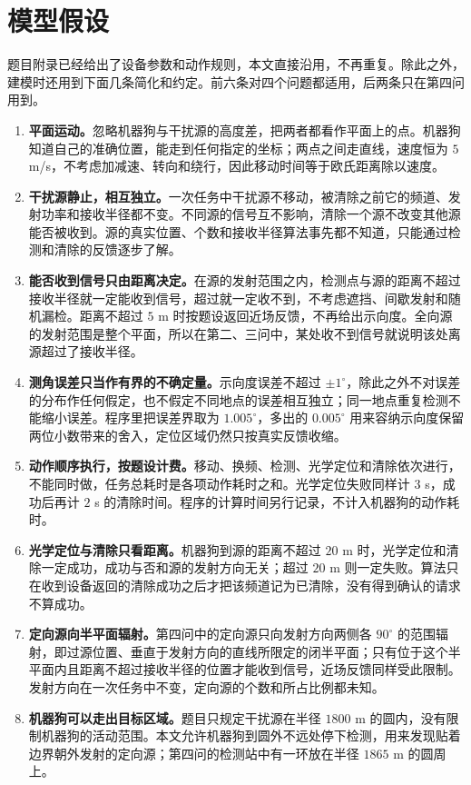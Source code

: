 \section{模型假设}\label{sec:model-assumptions}

题目附录已经给出了设备参数和动作规则，本文直接沿用，不再重复。除此之外，建模时还用到下面几条简化和约定。前六条对四个问题都适用，后两条只在第四问用到。

\begin{enumerate}
  \item \textbf{平面运动。}忽略机器狗与干扰源的高度差，把两者都看作平面上的点。机器狗知道自己的准确位置，能走到任何指定的坐标；两点之间走直线，速度恒为 $5$ m/s，不考虑加减速、转向和绕行，因此移动时间等于欧氏距离除以速度。

  \item \textbf{干扰源静止，相互独立。}一次任务中干扰源不移动，被清除之前它的频道、发射功率和接收半径都不变。不同源的信号互不影响，清除一个源不改变其他源能否被收到。源的真实位置、个数和接收半径算法事先都不知道，只能通过检测和清除的反馈逐步了解。

  \item \textbf{能否收到信号只由距离决定。}在源的发射范围之内，检测点与源的距离不超过接收半径就一定能收到信号，超过就一定收不到，不考虑遮挡、间歇发射和随机漏检。距离不超过 $5$ m 时按题设返回近场反馈，不再给出示向度。全向源的发射范围是整个平面，所以在第二、三问中，某处收不到信号就说明该处离源超过了接收半径。

  \item \textbf{测角误差只当作有界的不确定量。}示向度误差不超过 $\pm1^\circ$，除此之外不对误差的分布作任何假定，也不假定不同地点的误差相互独立；同一地点重复检测不能缩小误差。程序里把误差界取为 $1.005^\circ$，多出的 $0.005^\circ$ 用来容纳示向度保留两位小数带来的舍入，定位区域仍然只按真实反馈收缩。

  \item \textbf{动作顺序执行，按题设计费。}移动、换频、检测、光学定位和清除依次进行，不能同时做，任务总耗时是各项动作耗时之和。光学定位失败同样计 $3$ s，成功后再计 $2$ s 的清除时间。程序的计算时间另行记录，不计入机器狗的动作耗时。

  \item \textbf{光学定位与清除只看距离。}机器狗到源的距离不超过 $20$ m 时，光学定位和清除一定成功，成功与否和源的发射方向无关；超过 $20$ m 则一定失败。算法只在收到设备返回的清除成功之后才把该频道记为已清除，没有得到确认的请求不算成功。

  \item \textbf{定向源向半平面辐射。}第四问中的定向源只向发射方向两侧各 $90^\circ$ 的范围辐射，即过源位置、垂直于发射方向的直线所限定的闭半平面；只有位于这个半平面内且距离不超过接收半径的位置才能收到信号，近场反馈同样受此限制。发射方向在一次任务中不变，定向源的个数和所占比例都未知。

  \item \textbf{机器狗可以走出目标区域。}题目只规定干扰源在半径 $1800$ m 的圆内，没有限制机器狗的活动范围。本文允许机器狗到圆外不远处停下检测，用来发现贴着边界朝外发射的定向源；第四问的检测站中有一环放在半径 $1865$ m 的圆周上。
\end{enumerate}

